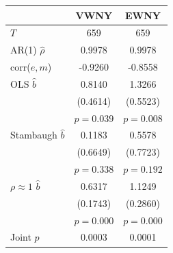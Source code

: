 \begin{tabular}{lcc}
\toprule
 & VWNY & EWNY \\
\midrule
$T$ & 659 & 659 \\
AR(1) $\hat\rho$ & 0.9978 & 0.9978 \\
corr($e,m$) & -0.9260 & -0.8558 \\
\midrule
OLS $\hat b$ & 0.8140 & 1.3266 \\
 & (0.4614) & (0.5523) \\
 & $p=0.039$ & $p=0.008$ \\
Stambaugh $\hat b$ & 0.1183 & 0.5578 \\
 & (0.6649) & (0.7723) \\
 & $p=0.338$ & $p=0.192$ \\
$\rho\approx1$ $\hat b$ & 0.6317 & 1.1249 \\
 & (0.1743) & (0.2860) \\
 & $p=0.000$ & $p=0.000$ \\
\midrule
Joint $p$ & 0.0003 & 0.0001 \\
\bottomrule
\end{tabular}
